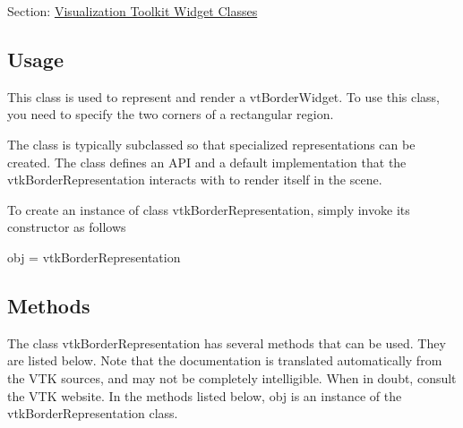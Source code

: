 Section\-: \hyperlink{sec_vtkwidgets}{Visualization Toolkit Widget Classes} \hypertarget{vtkwidgets_vtkxyplotwidget_Usage}{}\subsection{Usage}\label{vtkwidgets_vtkxyplotwidget_Usage}
This class is used to represent and render a vt\-Border\-Widget. To use this class, you need to specify the two corners of a rectangular region.

The class is typically subclassed so that specialized representations can be created. The class defines an A\-P\-I and a default implementation that the vtk\-Border\-Representation interacts with to render itself in the scene.

To create an instance of class vtk\-Border\-Representation, simply invoke its constructor as follows \begin{DoxyVerb}  obj = vtkBorderRepresentation
\end{DoxyVerb}
 \hypertarget{vtkwidgets_vtkxyplotwidget_Methods}{}\subsection{Methods}\label{vtkwidgets_vtkxyplotwidget_Methods}
The class vtk\-Border\-Representation has several methods that can be used. They are listed below. Note that the documentation is translated automatically from the V\-T\-K sources, and may not be completely intelligible. When in doubt, consult the V\-T\-K website. In the methods listed below, {\ttfamily obj} is an instance of the vtk\-Border\-Representation class. 
